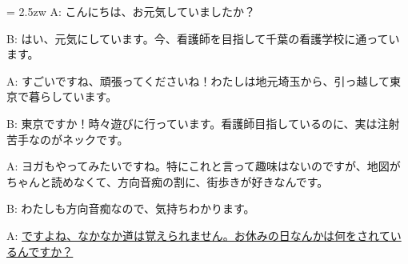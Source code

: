 \documentclass[11pt]{amsart}
\title{}
\author{}
\newenvironment{hangall}[1]{\hangindent = 2.5zw\everypar{\hangindent = 2.5zw}}{}
\begin{document}
\maketitle
\begin{hangall}{}%
A: こんにちは、お元気していましたか？

B: はい、元気にしています。今、看護師を目指して千葉の看護学校に通っています。

A: すごいですね、頑張ってくださいね！わたしは地元埼玉から、引っ越して東京で暮らしています。

B: 東京ですか！時々遊びに行っています。看護師目指しているのに、実は注射苦手なのがネックです。

A: ヨガもやってみたいですね。特にこれと言って趣味はないのですが、地図がちゃんと読めなくて、方向音痴の割に、街歩きが好きなんです。

B: わたしも方向音痴なので、気持ちわかります。

A: \ul{ですよね、なかなか道は覚えられません。お休みの日なんかは何をされているんですか？}\end{hangall}
\end{document}
